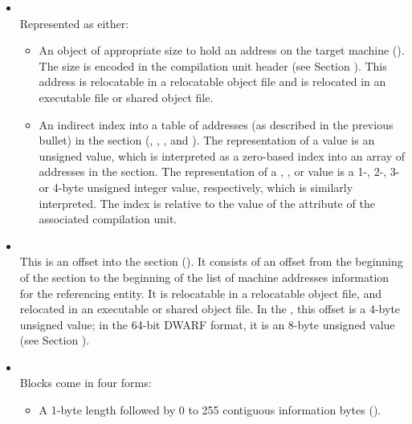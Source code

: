 \begin{itemize}

\item \CLASSaddress \\
Represented as either:
\begin{itemize}
\item An object of appropriate size to hold an
address on the target machine (\DWFORMaddrTARG). 
The size is encoded in the compilation unit header 
(see Section ).
This address is relocatable in a relocatable object file and
is relocated in an executable file or shared object file.

\item An indirect index into a table of addresses (as 
described in the previous bullet) in the \dotdebugaddr{} section 
(\DWFORMaddrxTARG, \DWFORMaddrxoneTARG, \DWFORMaddrxtwoTARG, 
\DWFORMaddrxthreeTARG{} and \DWFORMaddrxfourTARG). 
The representation of a \DWFORMaddrxNAME{} value is an unsigned
 value, which is interpreted as a zero-based 
index into an array of addresses in the \dotdebugaddr{} section.
The representation of a \DWFORMaddrxoneNAME, \DWFORMaddrxtwoNAME, 
\DWFORMaddrxthreeNAME{} or \DWFORMaddrxfourNAME{} value is a 
1-, 2-, 3- or 4-byte unsigned integer value, respectively,
which is similarly interpreted.
The index is relative to the value of the \DWATaddrbase{} attribute 
of the associated compilation unit.

\end{itemize}

\item \CLASSaddrptr \\
This is an offset into the \dotdebugaddr{} section (\DWFORMsecoffset). It
consists of an offset from the beginning of the \dotdebugaddr{} section to the
beginning of the list of machine addresses information for the
referencing entity. It is relocatable in
a relocatable object file, and relocated in an executable or
shared object file. In the \thirtytwobitdwarfformat, this offset
is a 4-byte unsigned value; in the 64-bit DWARF
format, it is an 8-byte unsigned value (see Section
).

\item \CLASSblock \\
Blocks come in four forms:
\begin{itemize}
\item
A 1-byte length followed by 0 to 255 contiguous information
bytes (\DWFORMblockoneTARG).


\end{itemize}
\end{itemize}

